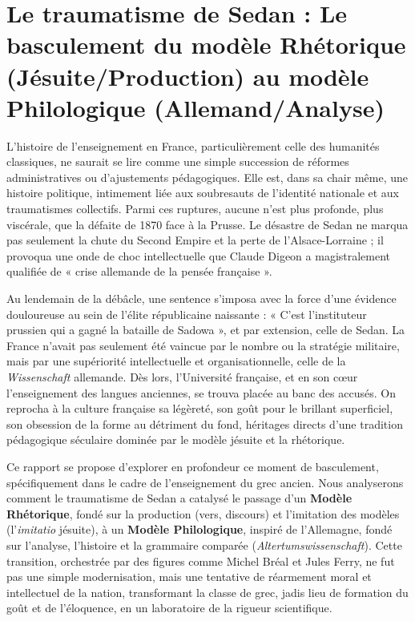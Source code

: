 

\section{Le traumatisme de Sedan : Le basculement du modèle Rhétorique (Jésuite/Production) au modèle Philologique (Allemand/Analyse)}

L'histoire de l'enseignement en France, particulièrement celle des humanités classiques, ne saurait
se lire comme une simple succession de réformes administratives ou d'ajustements pédagogiques. Elle
est, dans sa chair même, une histoire politique, intimement liée aux soubresauts de l'identité
nationale et aux traumatismes collectifs. Parmi ces ruptures, aucune n'est plus profonde, plus
viscérale, que la défaite de 1870 face à la Prusse. Le désastre de Sedan ne marqua pas seulement la
chute du Second Empire et la perte de l'Alsace-Lorraine ; il provoqua une onde de choc
intellectuelle que Claude Digeon a magistralement qualifiée de « crise allemande de la pensée
française ».\cite{I-1-1-ref1}

Au lendemain de la débâcle, une sentence s'imposa avec la force d'une évidence douloureuse au sein
de l'élite républicaine naissante : « C'est l'instituteur prussien qui a gagné la bataille de Sadowa
», et par extension, celle de Sedan. La France n'avait pas seulement été vaincue par le nombre ou la
stratégie militaire, mais par une supériorité intellectuelle et organisationnelle, celle de la
\textit{Wissenschaft} allemande. Dès lors, l'Université française, et en son cœur l'enseignement des
langues anciennes, se trouva placée au banc des accusés. On reprocha à la culture française sa
légèreté, son goût pour le brillant superficiel, son obsession de la forme au détriment du fond,
héritages directs d'une tradition pédagogique séculaire dominée par le modèle jésuite et la
rhétorique.\cite{I-1-1-ref1}

Ce rapport se propose d'explorer en profondeur ce moment de basculement, spécifiquement dans le
cadre de l'enseignement du grec ancien. Nous analyserons comment le traumatisme de Sedan a catalysé
le passage d'un \textbf{Modèle Rhétorique}, fondé sur la production (vers, discours) et l'imitation
des modèles (l'\textit{imitatio} jésuite), à un \textbf{Modèle Philologique}, inspiré de
l'Allemagne, fondé sur l'analyse, l'histoire et la grammaire comparée
(\textit{Altertumswissenschaft}). Cette transition, orchestrée par des figures comme Michel Bréal et
Jules Ferry, ne fut pas une simple modernisation, mais une tentative de réarmement moral et
intellectuel de la nation, transformant la classe de grec, jadis lieu de formation du goût et de
l'éloquence, en un laboratoire de la rigueur scientifique.



